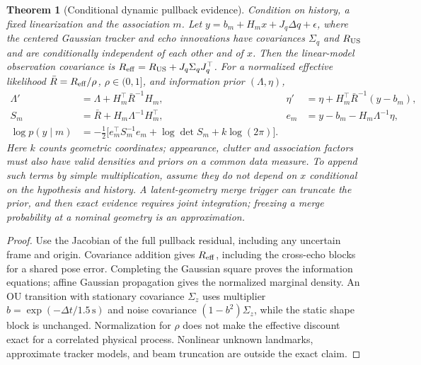 \documentclass[11pt]{article}
\newtheorem{theorem}{Theorem}
\begin{document}
\begin{theorem}[Conditional dynamic pullback evidence]\label{thm:pullback}
Condition on history, a fixed linearization and the association $m$. Let
$y=b_m+H_m x+J_q\Delta q+\epsilon$, where the centered Gaussian tracker and
echo innovations have covariances $\Sigma_q$ and $R_{\rm US}$ and are
conditionally independent of each other and of $x$. Then the linear-model
observation covariance is $R_{\rm eff}=R_{\rm US}+J_q\Sigma_qJ_q^\top$.
For a normalized effective likelihood $\bar R=R_{\rm eff}/\rho$,
$\rho\in(0,1]$, and information prior $(\Lambda,\eta)$,
\begin{align*}
 \Lambda'&=\Lambda+H_m^\top\bar R^{-1}H_m, &
 \eta'&=\eta+H_m^\top\bar R^{-1}(y-b_m),\\
 S_m&=\bar R+H_m\Lambda^{-1}H_m^\top, &
 e_m&=y-b_m-H_m\Lambda^{-1}\eta,\\
 \log p(y\mid m)&=-\tfrac12\big[e_m^\top S_m^{-1}e_m+
 \log\det S_m+k\log(2\pi)\big].
\end{align*}
Here $k$ counts geometric coordinates; appearance, clutter and association
factors must also have valid densities and priors on a common data measure.
To append such terms by simple multiplication, assume they do not depend
on $x$ conditional on the hypothesis and history. A latent-geometry merge
trigger can truncate the prior, and then exact evidence requires joint
integration; freezing a merge probability at a nominal geometry is an
approximation.
\end{theorem}
\begin{proof}
Use the Jacobian of the full pullback residual, including any uncertain
frame and origin. Covariance addition gives $R_{\rm eff}$, including the
cross-echo blocks for a shared pose error. Completing the Gaussian square
proves the information equations; affine Gaussian propagation gives the
normalized marginal density. An OU transition with stationary covariance
$\Sigma_z$ uses multiplier $b=\exp(-\Delta t/1.5\,\mathrm{s})$ and noise
covariance $(1-b^2)\Sigma_z$, while the static shape block is unchanged.
Normalization for $\rho$ does not make the effective discount exact for a
correlated physical process. Nonlinear unknown landmarks, approximate
tracker models, and beam truncation are outside the exact claim.
\end{proof}
\end{document}
